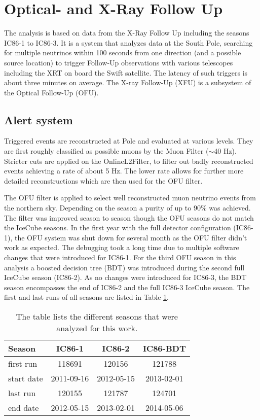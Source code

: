 \section{Optical- and X-Ray Follow Up}
\label{sec:OFU}
The analysis is based on data from the X-Ray Follow Up including the seasons 
IC86-1 to IC86-3. It is a system that analyzes data at the South Pole, 
searching for multiple neutrinos within 100 seconds from one direction (and a 
possible source 
location) to trigger Follow-Up observations with various telescopes including 
the XRT on board the Swift satellite. The latency of such triggers is about 
three minutes on average. The X-ray Follow-Up (XFU) is a subsystem of the 
Optical Follow-Up (OFU).
\subsection{Alert system}

Triggered events are reconstructed at Pole and evaluated at various levels. 
They are first roughly classified as possible muons by the Muon Filter 
($\sim$40 Hz). Stricter cuts are applied on the OnlineL2Filter, to filter 
out badly reconstructed events achieving a rate of about 5 Hz. The lower rate 
allows for further more detailed reconstructions which are then used for the 
OFU filter. 

The OFU filter is applied to select well reconstructed muon neutrino events 
from the northern sky. Depending on the season a purity of up to 90\% was 
achieved. The filter was improved season to season though the OFU seasons do 
not match the IceCube seasons. In the first year with the full detector 
configuration (IC86-1), the OFU system was shut down for several month as the 
OFU filter didn't work as expected. The debugging took a long time due to 
multiple software changes that were introduced for IC86-1. For the third OFU 
season in this analysis a boosted decision tree (BDT) was introduced during the 
second full IceCube season (IC86-2). As no changes were introduced for IC86-3, 
the BDT season encompasses the end of IC86-2 and the full IC86-3 IceCube 
season. The first and last runs of all seasons are listed in Table 
\ref{tab:ofu_seasons}.

\begin{table}[h]
  \centering
  \begin{tabular}{l||c|c|c}
   Season & IC86-1 & IC86-2 & IC86-BDT \\
\hline
   first run & 118691  & 120156  & 121788  \\
   start date & 2011-09-16 & 2012-05-15 & 2013-02-01\\
\hline
   last run  & 120155 & 121787 & 124701 \\
   end date & 2012-05-15  & 2013-02-01 & 2014-05-06 \\
  \end{tabular}
  \caption{The table lists the different seasons that were analyzed for this 
work.}
  \label{tab:ofu_seasons}
\end{table}

